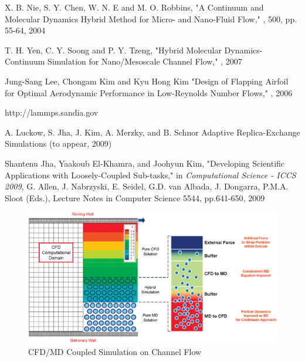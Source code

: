 \documentclass[a4paper]{article}
\begin{document}
\begin{thebibliography}{99}
X. B. Nie, S. Y. Chen, W. N. E and M. O. Robbins,
\newblock "A Continuum and Molecular Dynamics Hybrid Method for Micro- and Nano-Fluid Flow,"
, 500, pp. 55-64, 2004

T. H. Yen, C. Y. Soong and P. Y. Tzeng,
\newblock "Hybrid Molecular Dynamics-Continuum Simulation for Nano/Mesoscale Channel Flow,"
, 2007

Jung-Sang Lee, Chongam Kim and Kyu Hong Kim
\newblock "Design of Flapping Airfoil for Optimal Aerodynamic Performance in Low-Reynolds Number Flows,"
, 2006

http://lammps.sandia.gov

A. Luckow, S. Jha, J. Kim, A. Merzky, and B. Schnor
\newblock Adaptive Replica-Exchange Simulations
 (to appear, 2009)


Shantenu Jha, Yaakoub El-Khamra, and Joohyun Kim,
\newblock "Developing Scientific Applications with Loosely-Coupled Sub-tasks,"
\newblock in {\em Computational Science - ICCS 2009}, G. Allen, J. Nabrzyski, E. Seidel, G.D. van Albada, J. Dongarra, P.M.A. Sloot (Eds.), Lecture Notes in Computer Science 5544, pp.641-650, 2009

\end{thebibliography}

\vspace{12pt}


\begin{figure}
\centering
\includegraphics[scale=0.5]{Image1.eps}
\caption{CFD/MD Coupled Simulation on Channel Flow}
\end{figure}
\end{document}
